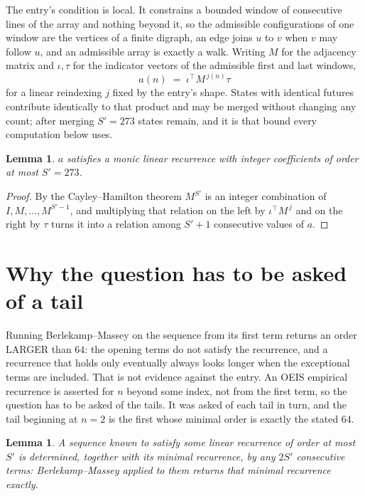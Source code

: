 \documentclass[11pt,a4paper]{article}
\theoremstyle{plain}
\newtheorem{lemma}[theorem]{Lemma}
\theoremstyle{definition}
\begin{document}
The entry's condition is local. It constrains a bounded window of consecutive lines of the
array and nothing beyond it, so the admissible configurations of one window are the vertices of
a finite digraph, an edge joins $u$ to $v$ when $v$ may follow $u$, and an admissible array is
exactly a walk. Writing $M$ for the adjacency matrix and $\iota,\tau$ for the indicator vectors
of the admissible first and last windows,
\[
a(n)\;=\;\iota^{\!\top}M^{\,j(n)}\tau
\]
for a linear reindexing $j$ fixed by the entry's shape. States with identical futures
contribute identically to that product and may be merged without changing any count; after
merging $S'=273$ states remain, and it is that bound every computation below uses.

\begin{lemma}\label{lem:cf}
$a$ satisfies a monic linear recurrence with integer coefficients of order at most $S'=273$.
\end{lemma}

\begin{proof}
By the Cayley--Hamilton theorem $M^{S'}$ is an integer combination of $I,M,\dots,M^{S'-1}$,
and multiplying that relation on the left by $\iota^{\!\top}M^{\,j}$ and on the right by
$\tau$ turns it into a relation among $S'+1$ consecutive values of $a$.
\end{proof}

\section{Why the question has to be asked of a tail}

Running Berlekamp--Massey on the sequence from its first term returns an order LARGER than $64$: the opening terms do not satisfy the recurrence, and a recurrence that holds only eventually always looks longer when the exceptional terms are included. That is not evidence against the entry. An OEIS empirical recurrence is asserted for $n$ beyond some index, not from the first term, so the question has to be asked of the tails. It was asked of each tail in turn, and the tail beginning at $n=2$ is the first whose minimal order is exactly the stated $64$.

\begin{lemma}\label{lem:bm}
A sequence known to satisfy some linear recurrence of order at most $S'$ is determined,
together with its minimal recurrence, by any $2S'$ consecutive terms: Berlekamp--Massey applied
to them returns that minimal recurrence exactly.
\end{lemma}
\end{document}
